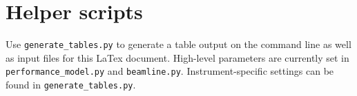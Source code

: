 \documentclass[a4paper,english,numbers=noenddot,bibliography=totoc,chapterprefix=on,DIV=12]{scrartcl}
\begin{document}
\section{Helper scripts}
\label{app:scripts}

Use \verb|generate_tables.py| to generate a table output on the command line as well as input files for this LaTex document.
High-level parameters are currently set in \verb|performance_model.py| and \verb|beamline.py|.
Instrument-specific settings can be found in \verb|generate_tables.py|.
\end{document}
